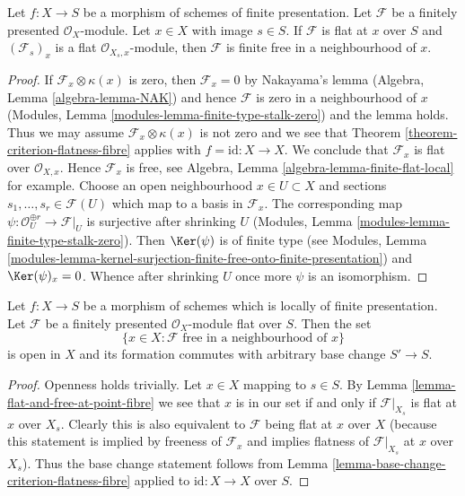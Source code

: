 \begin{lemma}
\label{lemma-flat-and-free-at-point-fibre}
Let $f : X \to S$ be a morphism of schemes of finite presentation.
Let $\mathcal{F}$ be a finitely presented $\mathcal{O}_X$-module.
Let $x \in X$ with image $s \in S$.
If $\mathcal{F}$ is flat at $x$ over $S$ and $(\mathcal{F}_s)_x$ is a flat
$\mathcal{O}_{X_s, x}$-module, then $\mathcal{F}$
is finite free in a neighbourhood of $x$.
\end{lemma}

\begin{proof}
If $\mathcal{F}_x \otimes \kappa(x)$ is zero, then $\mathcal{F}_x = 0$
by Nakayama's lemma (Algebra, Lemma \ref{algebra-lemma-NAK}) and hence
$\mathcal{F}$ is zero in a neighbourhood of $x$
(Modules, Lemma \ref{modules-lemma-finite-type-stalk-zero})
and the lemma holds. Thus we may assume $\mathcal{F}_x \otimes \kappa(x)$
is not zero and we see that
Theorem \ref{theorem-criterion-flatness-fibre}
applies with $f = \text{id} : X \to X$. We conclude that $\mathcal{F}_x$
is flat over $\mathcal{O}_{X, x}$. Hence $\mathcal{F}_x$ is free, see
Algebra, Lemma \ref{algebra-lemma-finite-flat-local} for example.
Choose an open neighbourhood $x \in U \subset X$ and sections
$s_1, \ldots, s_r \in \mathcal{F}(U)$ which map to a basis in
$\mathcal{F}_x$. The corresponding map
$\psi : \mathcal{O}_U^{\oplus r} \to \mathcal{F}|_U$ is surjective after
shrinking $U$ (Modules, Lemma \ref{modules-lemma-finite-type-stalk-zero}).
Then $\Ker(\psi)$ is of finite type (see Modules, Lemma
\ref{modules-lemma-kernel-surjection-finite-free-onto-finite-presentation})
and $\Ker(\psi)_x = 0$. Whence after shrinking $U$ once more
$\psi$ is an isomorphism.
\end{proof}

\begin{lemma}
\label{lemma-finite-free-open}
Let $f : X \to S$ be a morphism of schemes which is
locally of finite presentation.
Let $\mathcal{F}$ be a finitely presented $\mathcal{O}_X$-module
flat over $S$. Then the set
$$
\{x \in X : \mathcal{F}\text{ free in a neighbourhood of }x\}
$$
is open in $X$ and its formation commutes with arbitrary base change
$S' \to S$.
\end{lemma}

\begin{proof}
Openness holds trivially. Let $x \in X$ mapping to $s \in S$.
By Lemma \ref{lemma-flat-and-free-at-point-fibre}
we see that $x$ is in our set if and only if
$\mathcal{F}|_{X_s}$ is flat at $x$ over $X_s$.
Clearly this is also equivalent to $\mathcal{F}$ being
flat at $x$ over $X$ (because this statement is
implied by freeness of $\mathcal{F}_x$ and implies
flatness of $\mathcal{F}|_{X_s}$ at $x$ over $X_s$).
Thus the base change statement follows from
Lemma \ref{lemma-base-change-criterion-flatness-fibre}
applied to $\text{id} : X \to X$ over $S$.
\end{proof}






